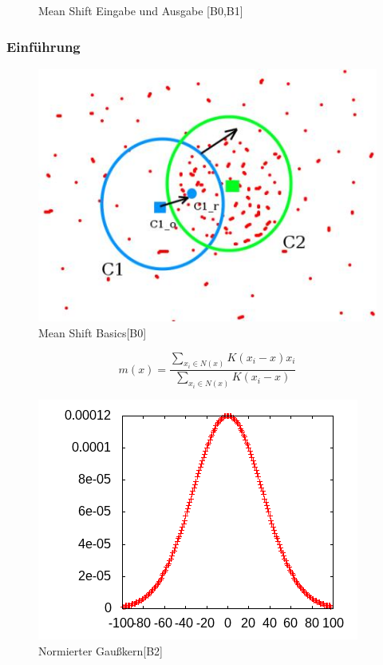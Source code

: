 \documentclass[10pt,utf8]{beamer}
\begin{document}
\begin{frame}
\begin{figure}[p!]
			\caption{Mean Shift Eingabe und Ausgabe [B0,B1]}
		\end{figure}
\end{frame}
\begin{frame}
	\frametitle{Einf\"uhrung}
\begin{figure}
	\includegraphics[scale=0.6]{meanshift_basics.jpg}
	\vspace{-10pt}
	\caption{Mean Shift Basics[B0]}
\end{figure}
\end{frame}
\begin{frame}
 		\[ m(x) = \frac{\sum_{x_i \in N(x)} K(x_i - x) x_i }{\sum_{x_i \in N(x)} K(x_i - x)} \]
\begin{figure}
    \begin{columns}%
        \begin{column}{0.5\textwidth}%
	  \includegraphics[scale=0.7]{../output/pics/gauss.png}
        \end{column}%
        \begin{column}{0.7\textwidth}%
			\vspace{-10pt}
			\hspace{35pt}
		\caption{Normierter Gaußkern[B2]}
        \end{column}%
    \end{columns}
\end{figure}
\end{frame}
\end{document}
